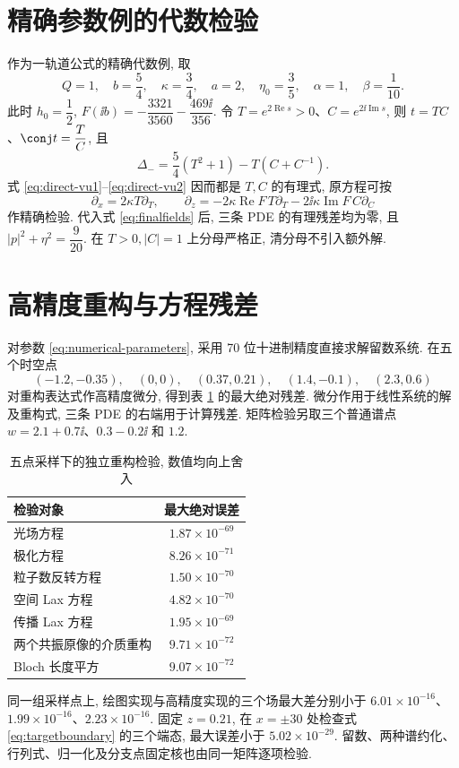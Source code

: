 \section{精确参数例的代数检验}
作为一轨道公式的精确代数例, 取
\begin{equation}\label{eq:exactparams}
Q=1,\quad b=\dfrac{5}{4},\quad\kappa=\dfrac{3}{4},\quad
a=2,\quad\eta_0=\dfrac{3}{5},\quad\alpha=1,\quad\beta=\dfrac{1}{10}.
\end{equation}
此时 $h_0=\dfrac{1}{2}$, $F(\ii b)=-\dfrac{3321}{3560}-\dfrac{469\ii}{356}$. 令
$T=e^{2\operatorname{Re}s}>0$、$C=e^{2\ii\operatorname{Im}s}$, 则 $t=TC$、$\conj t=\dfrac{T}{C}$, 且
\[
\Delta_-=\dfrac{5}{4}(T^2+1)-T(C+C^{-1}).
\]
式 \eqref{eq:direct-vu1}--\eqref{eq:direct-vu2} 因而都是 $T,C$ 的有理式, 原方程可按
\[
\partial_x=2\kappa T\partial_T,\qquad
\partial_z=-2\kappa\operatorname{Re}F\,T\partial_T
-2\ii\kappa\operatorname{Im}F\,C\partial_C
\]
作精确检验. 代入式 \eqref{eq:finalfields} 后, 三条 PDE 的有理残差均为零, 且 $|p|^2+\eta^2=\dfrac{9}{20}$. 在 $T>0,|C|=1$ 上分母严格正, 清分母不引入额外解.


\section{高精度重构与方程残差}
对参数 \eqref{eq:numerical-parameters}, 采用 70 位十进制精度直接求解留数系统. 在五个时空点
\[
(-1.2,-0.35),\quad(0,0),\quad(0.37,0.21),\quad
(1.4,-0.1),\quad(2.3,0.6)
\]
对重构表达式作高精度微分, 得到表 \ref{tab:direct-residuals} 的最大绝对残差. 微分作用于线性系统的解及重构式, 三条 PDE 的右端用于计算残差. 矩阵检验另取三个普通谱点 $w=2.1+0.7\ii$、$0.3-0.2\ii$ 和 $1.2$.
\begin{table}[htbp]
\centering
\caption{五点采样下的独立重构检验, 数值均向上舍入}
\label{tab:direct-residuals}
\begin{tabular}{lc}
\toprule 检验对象 & 最大绝对误差\\\midrule
光场方程 & $1.87\times10^{-69}$\\
极化方程 & $8.26\times10^{-71}$\\
粒子数反转方程 & $1.50\times10^{-70}$\\
空间 Lax 方程 & $4.82\times10^{-70}$\\
传播 Lax 方程 & $1.95\times10^{-69}$\\
两个共振原像的介质重构 & $9.71\times10^{-72}$\\
Bloch 长度平方 & $9.07\times10^{-72}$\\
\bottomrule
\end{tabular}
\end{table}

同一组采样点上, 绘图实现与高精度实现的三个场最大差分别小于 $6.01\times10^{-16}$、$1.99\times10^{-16}$、$2.23\times10^{-16}$. 固定 $z=0.21$, 在 $x=\pm30$ 处检查式 \eqref{eq:targetboundary} 的三个端态, 最大误差小于 $5.02\times10^{-29}$. 留数、两种谱约化、行列式、归一化及分支点固定核也由同一矩阵逐项检验.
